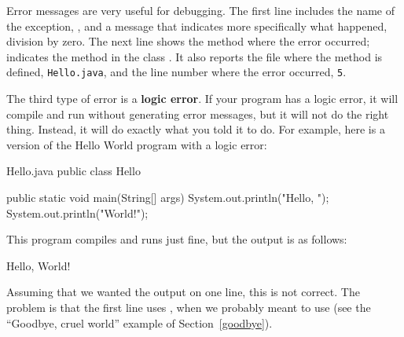 
Error messages are very useful for debugging.
The first line includes the name of the exception, , and a message that indicates more specifically what happened, division by zero.
The next line shows the method where the error occurred;  indicates the method  in the class .
It also reports the file where the method is defined, {\tt Hello.java}, and the line number where the error occurred, {\tt 5}.




The third type of error is a {\bf logic error}.
If your program has a logic error, it will compile and run without generating error messages, but it will not do the right thing.
Instead, it will do exactly what you told it to do.
For example, here is a version of the Hello World program with a logic error:

\begin{trinket}[235]{Hello.java}
public class Hello {

    public static void main(String[] args) {
        System.out.println("Hello, ");
        System.out.println("World!");
    }
}
\end{trinket}

This program compiles and runs just fine, but the output is as follows:

\begin{stdout}
Hello,
World!
\end{stdout}

Assuming that we wanted the output on one line, this is not correct.
The problem is that the first line uses , when we probably meant to use  (see the ``Goodbye, cruel world'' example of Section~\ref{goodbye}).

